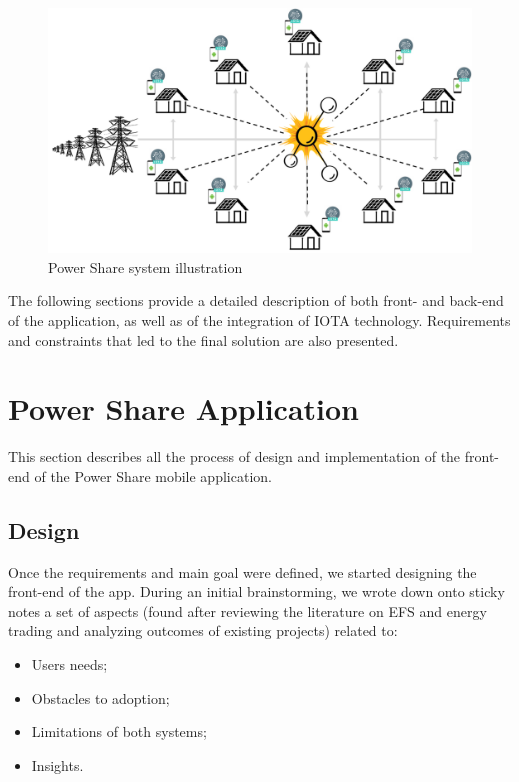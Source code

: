 \begin{figure}[h]
\centering
\includegraphics[width=1.0\textwidth]{./Images/ps}
\caption{Power Share system illustration}
\label{fig:ps}
\end{figure}


The following sections provide a detailed description of both front- and back-end of the application, as well as of the integration of IOTA technology. Requirements and constraints that led to the final solution are also presented. 

\section{Power Share Application}


This section describes all the process of design and implementation of the front-end of the Power Share mobile application.



\subsection{Design}


Once the requirements and main goal  were defined, we started designing the front-end of the app.  During an initial brainstorming, we wrote down onto sticky notes a set of aspects (found after reviewing the literature on \ac{EFS} and energy trading and analyzing outcomes of existing projects) related to:

\begin{itemize}
    \item Users needs;
    \item Obstacles to adoption;
    \item Limitations of both systems;
    \item Insights.
\end{itemize}


